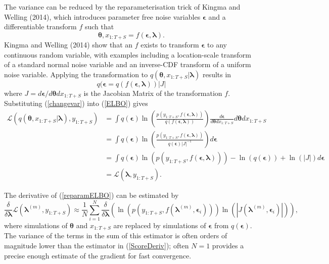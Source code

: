 \documentclass[12pt,a4paper]{article}%
\numberwithin{equation}{section}
\begin{document}
{{The variance can be reduced by the reparameterisation trick of Kingma and Welling (2014), which introduces parameter free noise variables $\boldsymbol{\epsilon}$ and a differentiable transform $f$ such that
\begin{equation}
\label{Reparam}
\boldsymbol{\theta}, x_{1:T+S} = f(\boldsymbol{\epsilon}, \boldsymbol{\lambda}).
\end{equation}
Kingma and Welling (2014) show that an $f$ exists to transform $\boldsymbol{\epsilon}$ to any continuous random variable, with examples including a location-scale transform of a standard normal noise variable and an inverse-CDF transform of a uniform noise variable. Applying the transformation to $q(\boldsymbol{\theta}, x_{1:T+S} | \boldsymbol{\lambda})$ results in
\begin{equation}
\label{changevar}
q(\boldsymbol{\epsilon} = q(f (\boldsymbol{\epsilon}, \boldsymbol{\lambda})) |J|
\end{equation}
where $J = d\boldsymbol{\epsilon}/d\boldsymbol{\theta}dx_{1:T+S}$ is the Jacobian Matrix of the transformation $f$. Substituting (\ref{changevar}) into (\ref{ELBO}) gives
\begin{align}
\mathcal{L}(q(\boldsymbol{\theta}, x_{1:T+S} | \boldsymbol{\lambda}), y_{1:T+S}) &= \int q(\boldsymbol{\epsilon}) \ln \left( \frac{p(y_{1:T+S},f (\boldsymbol{\epsilon}, \boldsymbol{\lambda}))}{q(f (\boldsymbol{\epsilon}, \boldsymbol{\lambda}))} \right) \frac{ d\boldsymbol{\epsilon}}{d\boldsymbol{\theta}dx_{1:T+S}}d\boldsymbol{\theta}dx_{1:T+S} \nonumber \\
&= \int q(\boldsymbol{\epsilon}) \ln \left( \frac{p(y_{1:T+S},f (\boldsymbol{\epsilon}, \boldsymbol{\lambda}))}{q(\boldsymbol{\epsilon})|J|^{-1}} \right) d\boldsymbol{\epsilon}\nonumber \\
&= \int q(\boldsymbol{\epsilon}) \ln (p(y_{1:T+S},f (\boldsymbol{\epsilon}, \boldsymbol{\lambda}))) - \ln(q(\boldsymbol{\epsilon})) + \ln(|J|) d\boldsymbol{\epsilon}\nonumber \\
&= \mathcal{L}(\boldsymbol{\lambda}, y_{1:T+S}). \label{reparamELBO}
\end{align}

The derivative of (\ref{reparamELBO}) can be estimated by
\begin{equation}
\label{ReparamDeriv}
\frac{\delta}{\delta\boldsymbol{\lambda}}\mathcal{L}(\boldsymbol{\lambda}^{(m)}, y_{1:T+S}) \approx \frac{1}{N}\sum_{i=1}^{N} \frac{\delta}{\delta\boldsymbol{\lambda}} \left( \ln (p(y_{1:T+S}, f(\boldsymbol{\lambda}^{(m)}, \boldsymbol{\epsilon}_i)))\ln(|J(\boldsymbol{\lambda}^{(m)}, \boldsymbol{\epsilon}_i)|) \right),
\end{equation}
where simulations of $\boldsymbol{\theta}$ and $x_{1:T+S}$ are replaced by simulations of $\boldsymbol{\epsilon}$ from $q(\boldsymbol{\epsilon})$. The variance of the terms in the sum of this estimator is often orders of magnitude lower than the estimator in (\ref{ScoreDeriv}); often $N = 1$ provides a precise enough estimate of the gradient for fast convergence.

}}
\end{document}
